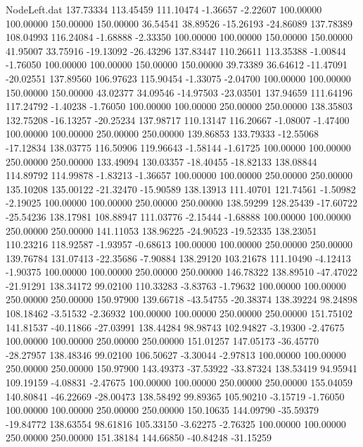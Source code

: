 \begin{filecontents}{NodeLeft.dat}
 137.73334  113.45459  111.10474    -1.36657   -2.22607  100.00000  100.00000  150.00000  150.00000   36.54541   38.89526  -15.26193  -24.86089
 137.78389  108.04993  116.24084    -1.68888   -2.33350  100.00000  100.00000  150.00000  150.00000   41.95007   33.75916  -19.13092  -26.43296
 137.83447  110.26611  113.35388    -1.00844   -1.76050  100.00000  100.00000  150.00000  150.00000   39.73389   36.64612  -11.47091  -20.02551
 137.89560  106.97623  115.90454    -1.33075   -2.04700  100.00000  100.00000  150.00000  150.00000   43.02377   34.09546  -14.97503  -23.03501
 137.94659  111.64196  117.24792    -1.40238   -1.76050  100.00000  100.00000  250.00000  250.00000  138.35803  132.75208  -16.13257  -20.25234
 137.98717  110.13147  116.20667    -1.08007   -1.47400  100.00000  100.00000  250.00000  250.00000  139.86853  133.79333  -12.55068  -17.12834
 138.03775  116.50906  119.96643    -1.58144   -1.61725  100.00000  100.00000  250.00000  250.00000  133.49094  130.03357  -18.40455  -18.82133
 138.08844  114.89792  114.99878    -1.83213   -1.36657  100.00000  100.00000  250.00000  250.00000  135.10208  135.00122  -21.32470  -15.90589
 138.13913  111.40701  121.74561    -1.50982   -2.19025  100.00000  100.00000  250.00000  250.00000  138.59299  128.25439  -17.60722  -25.54236
 138.17981  108.88947  111.03776    -2.15444   -1.68888  100.00000  100.00000  250.00000  250.00000  141.11053  138.96225  -24.90523  -19.52335
 138.23051  110.23216  118.92587    -1.93957   -0.68613  100.00000  100.00000  250.00000  250.00000  139.76784  131.07413  -22.35686   -7.90884
 138.29120  103.21678  111.10490    -4.12413   -1.90375  100.00000  100.00000  250.00000  250.00000  146.78322  138.89510  -47.47022  -21.91291
 138.34172   99.02100  110.33283    -3.83763   -1.79632  100.00000  100.00000  250.00000  250.00000  150.97900  139.66718  -43.54755  -20.38374
 138.39224   98.24898  108.18462    -3.51532   -2.36932  100.00000  100.00000  250.00000  250.00000  151.75102  141.81537  -40.11866  -27.03991
 138.44284   98.98743  102.94827    -3.19300   -2.47675  100.00000  100.00000  250.00000  250.00000  151.01257  147.05173  -36.45770  -28.27957
 138.48346   99.02100  106.50627    -3.30044   -2.97813  100.00000  100.00000  250.00000  250.00000  150.97900  143.49373  -37.53922  -33.87324
 138.53419   94.95941  109.19159    -4.08831   -2.47675  100.00000  100.00000  250.00000  250.00000  155.04059  140.80841  -46.22669  -28.00473
 138.58492   99.89365  105.90210    -3.15719   -1.76050  100.00000  100.00000  250.00000  250.00000  150.10635  144.09790  -35.59379  -19.84772
 138.63554   98.61816  105.33150    -3.62275   -2.76325  100.00000  100.00000  250.00000  250.00000  151.38184  144.66850  -40.84248  -31.15259

\end{filecontents}
